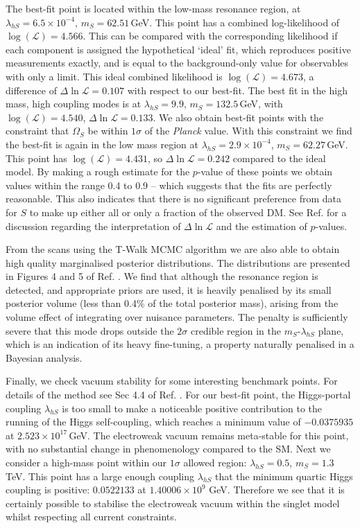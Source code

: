 \documentclass{PoS}
\newcommand\twalk{\textsf{T-Walk}\xspace}
\newcommand{\sss}{\scriptscriptstyle}
\newcommand{\ms}{m_{\sss S}}
\newcommand{\lhs}{\lambda_{h\sss S}}
\begin{document}
The best-fit point is located within the low-mass resonance region, at $\lhs = 6.5\times 10^{-4}$, $\ms=62.51$\,GeV.  This point has a combined log-likelihood of $\log(\mathcal{L})=4.566$.  This can be compared with the corresponding likelihood if each component is assigned the hypothetical `ideal' fit, which reproduces positive measurements exactly, and is equal to the background-only value for observables with only a limit.  This ideal combined likelihood is $\log(\mathcal{L})=4.673$, a difference of $\Delta\ln\mathcal{L}=0.107$ with respect to our best-fit. The best fit in the high mass, high coupling modes is at $\lhs=9.9$, $\ms=132.5$\,GeV, with $\log(\mathcal{L})=4.540$, $\Delta\ln\mathcal{L}=0.133$.  We also obtain best-fit points with the constraint that $\Omega_{\sss S}$ be within $1\sigma$ of the \textit{Planck} value.  With this constraint we find the best-fit is again in the low mass region at $\lhs=2.9 \times 10^{-4}$, $\ms = 62.27$\,GeV.  This point has $\log(\mathcal{L})=4.431$, so $\Delta\ln\mathcal{L}=0.242$ compared to the ideal model.  By making a rough estimate for the $p$-value of these points we obtain values within the range 0.4 to 0.9 -- which suggests that the fits are perfectly reasonable.  This also indicates that there is no significant preference from data for $S$ to make up either all or only a fraction of the observed DM.  See Ref. \cite{Athron:2017kgt} for a discussion regarding the interpretation of $\Delta\ln\mathcal{L}$ and the estimation of $p$-values.

From the scans using the \twalk MCMC algorithm we are also able to obtain high quality marginalised posterior distributions.  The distributions are presented in Figures 4 and 5 of Ref. \cite{Athron:2017kgt}.  We find that although the resonance region is detected, and appropriate priors are used, it is heavily penalised by its small posterior volume (less than 0.4\% of the total posterior mass), arising from the volume effect of integrating over nuisance parameters.  The penalty is sufficiently severe that this mode drops outside the $2\sigma$ credible region in the $\ms$-$\lhs$ plane, which is an indication of its heavy fine-tuning, a property naturally penalised in a Bayesian analysis.

Finally, we check vacuum stability for some interesting benchmark points.  For details of the method see Sec 4.4 of Ref. \cite{Athron:2017kgt}.  For our best-fit point, the Higgs-portal coupling $\lhs$ is too small to make a noticeable positive contribution to the running of the Higgs self-coupling, which reaches a minimum value of $-0.0375935$ at $2.523\times10^{17}$\,GeV.  The electroweak vacuum remains meta-stable for this point, with no substantial change in phenomenology compared to the SM.  Next we consider a high-mass point within our $1\sigma$ allowed region: $\lhs = 0.5$, $\ms = 1.3$\,TeV.  This point has a large enough coupling $\lhs$ that the minimum quartic Higgs coupling is positive: $0.0522133$ at $1.40006\times 10^9$ GeV.  Therefore we see that it is certainly possible to stabilise the electroweak vacuum within the singlet model whilst respecting all current constraints.
\end{document}

